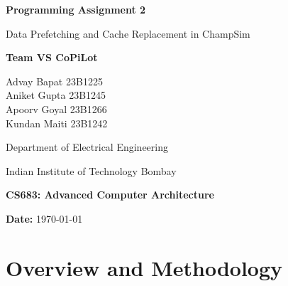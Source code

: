 \documentclass[12pt, a4paper]{article}
\begin{document}
\begin{titlepage}
    \centering
    \vspace*{1.5cm}

    {\huge\bfseries\color{accentcolor} Programming Assignment 2\par}
    \vspace{0.5cm}
    {\Large Data Prefetching and Cache Replacement in ChampSim\par}

    \vspace{2cm}

    \vspace{1.5cm}

    {\Large\bfseries Team VS CoPiLot \par}
    \vspace{0.5cm}
    {\large Advay Bapat 23B1225\\Aniket Gupta 23B1245\\ Apoorv Goyal 23B1266\\ Kundan Maiti 23B1242}\\
    {\large Department of Electrical Engineering \par}
    {\large Indian Institute of Technology Bombay \par}

    \vfill

    {\large \textbf{CS683: Advanced Computer Architecture} \par}
    \vspace{0.3cm}

    \vspace{0.3cm}
    {\large \textbf{Date:} \today \par}

    \vspace{1.5cm}
\end{titlepage}

\newpage

{\hypersetup{linkcolor=black}
\tableofcontents
}
\newpage


\section{Overview and Methodology}\label{sec:overview}
\end{document}
